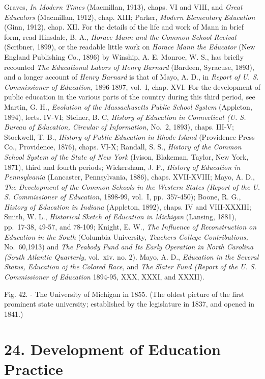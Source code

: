 \documentclass[]{book}
\begin{document}
Graves, \emph{In Modern Times} (Macmillan, 1913), chaps. VI and VIII, and \emph{Great Educators} (Macmillan, 1912), chap. XIII; Parker, \emph{Modern Elementary Education} (Ginn, 1912), chap. XII. For the details of the life and work of Mann in brief form, read Hinsdale, B. A., \emph{Horace Mann and the Common School Revival} (Scribner, 1899), or the readable little work on \emph{Horace Mann the Educator} (New England Publishing Co., 1896) by Winship, A. E. Monroe, W. S., has briefly recounted \emph{The Educational Labors of Henry Barnard} (Bardeen, Syracuse, 1893), and a longer account of \emph{Henry Barnard} is that of Mayo, A. D., in \emph{Report of U. S. Commissioner of Education,} 1896-1897, vol.~I, chap. XVI. For the development of public education in the various parts of the country during this third period, see Martin, G. H., \emph{Evolution of the Massachusetts Public School System} (Appleton, 1894), lects. IV-VI; Steiner, B. C, \emph{History of Education in Connecticut (U. S. Bureau of Education, Circular of Information,} No.~2, 1893), chaps. III-V; Stockwell, T. B., \emph{History of Public Education in Rhode Island} (Providence Press Co., Providence, 1876), chaps. VI-X; Randall, S. S., \emph{History of the Common School System of the State of New York} (Ivison, Blakeman, Taylor, New York, 1871), third and fourth periods; Wickersham, J. P., \emph{History of Education in Pennsylvania} (Lancaster, Pennsylvania, 1886), chaps. XVII-XVIII; Mayo, A. D., \emph{The Development of the Common Schools in the Western States (Report of the U. S. Commissioner of Education,} 1898-99, vol.~I, pp.~357-450); Boone, R. G., \emph{History of Education in Indiana} (Appleton, 1892), chaps. IV and VIII-XXXIII; Smith, W. L., \emph{Historical Sketch of Education in Michigan} (Lansing, 1881), pp.~17-38, 49-57, and 78-109; Knight, E. W., \emph{The Influence of Reconstruction on Education in the South} (Columbia University, \emph{Teachers College Contributions,} No.~60,1913) and \emph{The Peabody Fund and Its Early Operation in North Carolina (South Atlantic Quarterly,} vol.~xiv. no. 2). Mayo, A. D., \emph{Education in the Several Status, Education oj the Colored Race,} and \emph{The Slater Fund (Report of the U. S. Commissioner of Education} 1894-95, XXX, XXXI, and XXXII).

Fig. 42. - The University of Michigan in 1855. (The oldest picture of the first prominent state university; established by the legislature in 1837, and opened in 1841.)

\hypertarget{development-of-education-practice}{%
\chapter{24. Development of Education Practice}\label{development-of-education-practice}}
\end{document}
